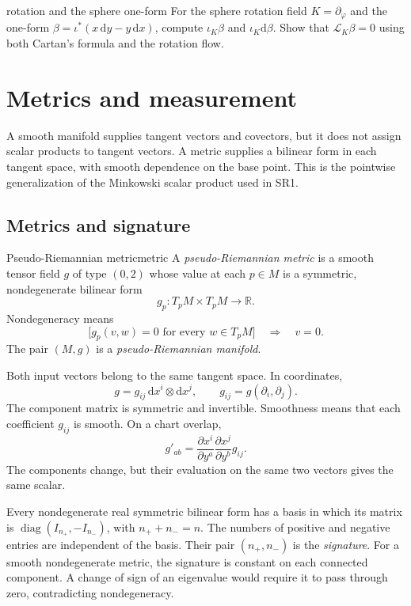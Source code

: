 \documentclass[11pt,a4paper]{article}
\numberwithin{equation}{section}
\newcommand{\R}{\mathbb R}
\newcommand{\dd}{\mathrm d}
\newcommand{\Lie}{\mathcal L}
\newcommand{\slideref}[1]{\par\nobreak\smallskip\nobreak{\footnotesize\color{ink!60}\textsc{Source slide #1}}\par\nobreak\smallskip\nobreak}
\begin{document}
\begin{studentwork}[3.8cm]{rotation and the sphere one-form}
For the sphere rotation field \(K=\partial_\varphi\) and the one-form
\(\beta=\iota^*(x\,\dd y-y\,\dd x)\), compute
\(\iota_K\beta\) and \(\iota_K\dd\beta\). Show that
\(\Lie_K\beta=0\) using both Cartan's formula and the rotation flow.
\end{studentwork}

\section{Metrics and measurement}
\label{sec:metrics}
\slideref{18}

A smooth manifold supplies tangent vectors and covectors, but it does not
assign scalar products to tangent vectors. A metric supplies a bilinear
form in each tangent space, with smooth dependence on the base point.
This is the pointwise generalization of the Minkowski scalar product
used in SR1.

\subsection{Metrics and signature}

\begin{definition}{Pseudo-Riemannian metric}{metric}
A \emph{pseudo-Riemannian metric} is a smooth tensor field \(g\) of
type \((0,2)\) whose value at each \(p\in M\) is a symmetric,
nondegenerate bilinear form
\[
 g_p:T_pM\times T_pM\longrightarrow\R.
\]
Nondegeneracy means
\[
 \bigl[g_p(v,w)=0\text{ for every }w\in T_pM\bigr]
 \quad\Longrightarrow\quad v=0.
\]
The pair \((M,g)\) is a \emph{pseudo-Riemannian manifold}.
\end{definition}

Both input vectors belong to the same tangent space. In coordinates,
\begin{equation}
 g=g_{ij}\,\dd x^i\otimes\dd x^j,
 \qquad g_{ij}=g(\partial_i,\partial_j).
 \label{eq:metric-tensor}
\end{equation}
The component matrix is symmetric and invertible. Smoothness means that
each coefficient \(g_{ij}\) is smooth. On a chart overlap,
\[
 g'_{ab}=\frac{\partial x^i}{\partial y^a}
         \frac{\partial x^j}{\partial y^b}g_{ij}.
\]
The components change, but their evaluation on the same two vectors
gives the same scalar.

Every nondegenerate real symmetric bilinear form has a basis in which
its matrix is \(\operatorname{diag}(I_{n_+},-I_{n_-})\), with
\(n_++n_-=n\). The numbers of positive and negative entries are
independent of the basis. Their pair \((n_+,n_-)\) is the
\emph{signature}. For a smooth nondegenerate metric, the signature is
constant on each connected component. A change of sign of an eigenvalue
would require it to pass through zero, contradicting nondegeneracy.
\end{document}

